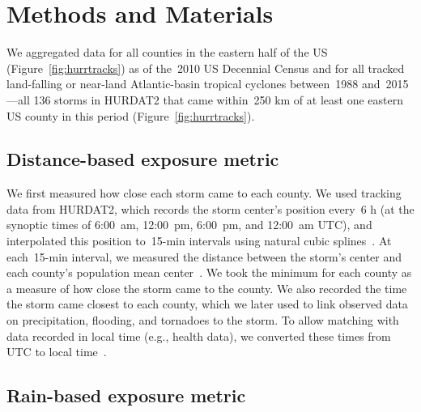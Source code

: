 \section*{Methods and Materials}

We aggregated data for all counties in the eastern half of the \ac{US}
(Figure~\ref{fig:hurrtracks}) as of the~2010 \ac{US} Decennial Census and for
all tracked land-falling or near-land Atlantic-basin tropical cyclones
between~1988 and~2015---all 136 storms in \ac{HURDAT2} \parencite{landsea2013}
that came within~250 \si{\kilo\metre} of at least one eastern \ac{US} county in
this period (Figure~\ref{fig:hurrtracks}). 

\subsection*{Distance-based exposure metric}

We first measured how close each storm came to each county. We used tracking
data from \ac{HURDAT2}, which records the storm center's position every~6
\si{\hour} (at the synoptic times of 6:00~am, 12:00~pm, 6:00~pm, and 12:00~am
\ac{UTC}), and interpolated this position to~15-\si{\minute} intervals using
natural cubic splines~\parencite{hurricaneexposure}. At each~15-\si{\minute}
interval, we measured the distance between the storm's center and each county's
population mean center~\parencite{bivand2013applied, countycenters}. We took
the minimum for each county as a measure of how close the storm came to the
county.  We also recorded the time the storm came closest to each county, which
we later used to link observed data on precipitation, flooding, and tornadoes
to the storm.  To allow matching with data recorded in local time (e.g., health
data), we converted these times from \ac{UTC} to local
time~\parencite{countytimezones}.

\subsection*{Rain-based exposure metric}

